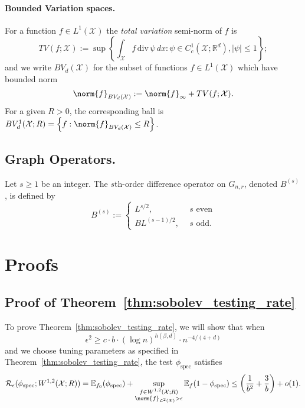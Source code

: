 \documentclass{article}
\newcommand{\Reals}{\mathbb{R}}
\newcommand{\abs}[1]{\left \lvert #1 \right \rvert}
\newcommand{\set}[1]{\left\{#1\right\}}
\newcommand{\1}{\mathbf{1}}
\newcommand{\Leb}{\mathcal{L}}
\newcommand{\Ebb}{\mathbb{E}}
\newcommand{\Xsetive}{\mathrm{div}}
\newcommand{\spec}{\mathrm{spec}}
\theoremstyle{alden}
\theoremstyle{aldenthm}
\theoremstyle{definition}
\theoremstyle{remark}
\begin{document}
\paragraph{Bounded Variation spaces.}

For a function $f \in L^1(\mathcal{X})$ the \emph{total variation} semi-norm of $f$ is
\begin{equation*}
TV(f;\mathcal{X}) := \sup \left\{ \int_{\mathcal{X}} f \, \Xsetive \, \psi \,dx : \psi \in C_c^1(\mathcal{X}; \Reals^d), \abs{\psi} \leq 1 \right\};
\end{equation*}
and we write $BV_d(\mathcal{X})$ for the subset of functions $f \in L^1(\mathcal{X})$ which have bounded norm
\begin{equation*}
\norm{f}_{BV_d(\mathcal{X})} := \norm{f}_{\infty} + TV(f;\mathcal{X}).
\end{equation*}
For a given $R > 0$, the corresponding ball is $BV_d^{1}(\mathcal{X};R) = \set{f: \norm{f}_{BV_d(\mathcal{X})} \leq R}$. 

\subsection{Graph Operators.}
Let $s \geq 1$ be an integer. The $s$th-order difference operator on $G_{n,r}$, denoted $B^{(s)}$, is defined by
\begin{equation*}
B^{(s)} :=
\begin{cases}
L^{s/2},& ~~ s \textrm{ even} \\
BL^{(s - 1)/2},& ~~ s \textrm{ odd.}
\end{cases}
\end{equation*}

\section{Proofs}

\subsection{Proof of Theorem~\ref{thm:sobolev_testing_rate}}

To prove Theorem~\ref{thm:sobolev_testing_rate}, we will show that when
\begin{equation}
\label{eqn:critical_radius}
\epsilon^2 \geq c \cdot b \cdot (\log n)^{h(\beta,d)} \cdot n^{-4/(4 + d)}
\end{equation}
and we choose tuning parameters as specified in Theorem~\ref{thm:sobolev_testing_rate}, the test $\phi_{\mathrm{spec}}$ satisfies
\begin{equation}
\mathcal{R}_{\epsilon}(\phi_{\spec}; W^{1,2}(\mathcal{X};R)) = \Ebb_{f_0}(\phi_{\spec}) + \sup_{\substack{f \in W^{1,2}(\mathcal{X};R) \\ \norm{f}_{\Leb^2(\mathcal{X})} > \epsilon}} \Ebb_{f}(1 - \phi_{\spec}) \leq \left(\frac{1}{b^2} + \frac{3}{b}\right) + o(1).
\end{equation}
\end{document}
